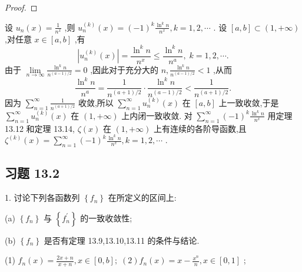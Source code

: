 \begin{proof}

\end{proof}
设 \({u}_{n}\left( x\right)  = \frac{1}{{n}^{x}}\) ,则 \({u}_{n}^{\left( k\right) }\left( x\right)  = {\left( -1\right) }^{k}\frac{{\ln }^{k}n}{{n}^{x}},k = 1,2,\cdots\) . 设 \(\left\lbrack  {a,b}\right\rbrack   \subset  \left( {1, + \infty }\right)\) ,对任意 \(x \in  \left\lbrack  {a,b}\right\rbrack\) ,有
\[
\left| {{u}_{n}^{\left( k\right) }\left( x\right) }\right|  = \frac{{\ln }^{k}n}{{n}^{x}} \leq  \frac{{\ln }^{k}n}{{n}^{a}},\;k = 1,2,\cdots .
\]
由于 \(\mathop{\lim }\limits_{{n \rightarrow  \infty }}\frac{{\ln }^{k}n}{{n}^{\left( {a - 1}\right) /2}} = 0\) ,因此对于充分大的 \(n,\frac{{\ln }^{k}n}{{n}^{\left( {a - 1}\right) /2}} < 1\) ,从而
\[
\frac{{\ln }^{k}n}{{n}^{a}} = \frac{1}{{n}^{\left( {a + 1}\right) /2}} \cdot  \frac{{\ln }^{k}n}{{n}^{\left( {a - 1}\right) /2}} < \frac{1}{{n}^{\left( {a + 1}\right) /2}}.
\]
因为 \(\mathop{\sum }\limits_{{n = 1}}^{\infty }\frac{1}{{n}^{\left( {a + 1}\right) /2}}\) 收敛,所以 \(\mathop{\sum }\limits_{{n = 1}}^{\infty }{u}_{n}^{\left( k\right) }\left( x\right)\) 在 \(\left\lbrack  {a,b}\right\rbrack\) 上一致收敛,于是 \(\mathop{\sum }\limits_{{n = 1}}^{\infty }{u}_{n}^{\left( k\right) }\left( x\right)\) 在 \(\left( {1, + \infty }\right)\) 上内闭一致收敛. 对 \(\mathop{\sum }\limits_{{n = 1}}^{\infty }{\left( -1\right) }^{k}\frac{{\ln }^{k}n}{{n}^{x}}\) 用定理 13.12 和定理 13.14, \(\zeta \left( x\right)\) 在 \(\left( {1, + \infty }\right)\) 上有连续的各阶导函数,且 \({\zeta }^{\left( k\right) }\left( x\right)  = \mathop{\sum }\limits_{{n = 1}}^{\infty }{\left( -1\right) }^{k}\frac{{\ln }^{k}n}{{n}^{x}},k = 1,2,\cdots\) .

\subsection{习题 13.2}

1. 讨论下列各函数列 \(\left\{  {f}_{n}\right\}\) 在所定义的区间上:

(a) \(\left\{  {f}_{n}\right\}\) 与 \(\left\{  {f}_{n}^{\prime }\right\}\) 的一致收敛性;

(b) \(\left\{  {f}_{n}\right\}\) 是否有定理 13.9,13.10,13.11 的条件与结论.

(1) \({f}_{n}\left( x\right)  = \frac{{2x} + n}{x + n},x \in  \left\lbrack  {0,b}\right\rbrack  ;\;\left( 2\right) {f}_{n}\left( x\right)  = x - \frac{{x}^{n}}{n},x \in  \left\lbrack  {0,1}\right\rbrack\) ;


